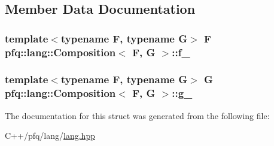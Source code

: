 \subsection{Member Data Documentation}
\subsubsection[{\texorpdfstring{f\+\_\+}{f_}}]{\setlength{\rightskip}{0pt plus 5cm}template$<$typename F, typename G$>$ F {\bf pfq\+::lang\+::\+Composition}$<$ F, G $>$\+::f\+\_\+}\hypertarget{structpfq_1_1lang_1_1Composition_a347bd26bc6d78fe7540e7e5f641fe69d}{}\label{structpfq_1_1lang_1_1Composition_a347bd26bc6d78fe7540e7e5f641fe69d}
\subsubsection[{\texorpdfstring{g\+\_\+}{g_}}]{\setlength{\rightskip}{0pt plus 5cm}template$<$typename F, typename G$>$ G {\bf pfq\+::lang\+::\+Composition}$<$ F, G $>$\+::g\+\_\+}\hypertarget{structpfq_1_1lang_1_1Composition_aabe9600a5e6184509c5ac8ae9685271e}{}\label{structpfq_1_1lang_1_1Composition_aabe9600a5e6184509c5ac8ae9685271e}


The documentation for this struct was generated from the following file\+:\begin{DoxyCompactItemize}
\item 
C++/pfq/lang/\hyperlink{lang_8hpp}{lang.\+hpp}\end{DoxyCompactItemize}
